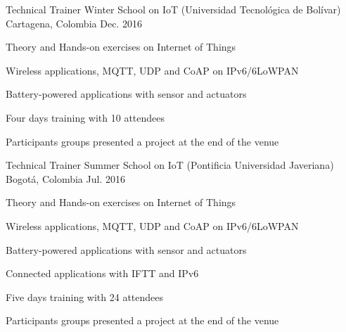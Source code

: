 

\begin{cventries}

  \cventry
    {Technical Trainer} %
    {Winter School on IoT (Universidad Tecnológica de Bolívar)} %
    {Cartagena, Colombia} %
    {Dec. 2016} %
    {
      \begin{cvitems} %
        \item {Theory and Hands-on exercises on Internet of Things}
        \item {Wireless applications, MQTT, UDP and CoAP on IPv6/6LoWPAN}
        \item {Battery-powered applications with sensor and actuators}
        \item {Four days training with 10 attendees}
        \item {Participants groups presented a project at the end of the venue }
      \end{cvitems}
    }

  \cventry
    {Technical Trainer} %
    {Summer School on IoT (Pontificia Universidad Javeriana)} %
    {Bogotá, Colombia} %
    {Jul. 2016} %
    {
      \begin{cvitems} %
        \item {Theory and Hands-on exercises on Internet of Things}
        \item {Wireless applications, MQTT, UDP and CoAP on IPv6/6LoWPAN}
        \item {Battery-powered applications with sensor and actuators}
        \item {Connected applications with IFTT and IPv6}
        \item {Five days training with 24 attendees}
        \item {Participants groups presented a project at the end of the venue }
      \end{cvitems}
    }


\end{cventries}
